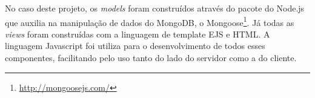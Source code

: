 No caso deste projeto, os \emph{models} foram construídos através do pacote do Node.js que auxilia
na manipulação de dados do MongoDB, o Mongoose\footnote{\url{http://mongoosejs.com/}}. Já todas as \emph{views}
foram construídas com a linguagem de template EJS e HTML. A linguagem Javascript foi utiliza para o desenvolvimento
de todos esses componentes, facilitando pelo uso tanto do lado do servidor como a do cliente.
